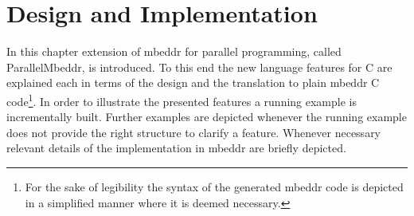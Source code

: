 \chapter{Design and Implementation}
In this chapter extension of mbeddr for parallel programming, called ParallelMbeddr, is introduced. To this end the new language features for C are explained each in terms of the design and the translation to plain mbeddr C code\footnote{For the sake of legibility the syntax of the generated mbeddr code is depicted in a simplified manner where it is deemed necessary.}. In order to illustrate the presented features a running example is incrementally built. Further examples are depicted whenever the running example does not provide the right structure to clarify a feature.
Whenever necessary relevant details of the implementation in mbeddr are briefly depicted. 




